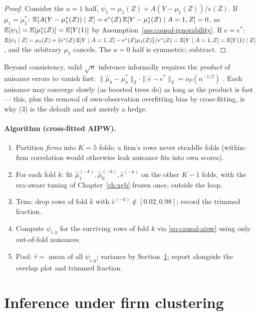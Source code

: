 \begin{proof}
Consider the $a=1$ half, $\psi_1 = \mu_1(Z) + A(Y - \mu_1(Z))/e(Z)$. If
$\mu_1 = \mu_1^*$: $\mathbb{E}[A(Y - \mu_1^*(Z)) \mid Z] = e^*(Z)\,\mathbb{E}[Y - \mu_1^*(Z) \mid A=1,
Z] = 0$, so $\mathbb{E}[\psi_1] = \mathbb{E}[\mu_1^*(Z)] = \mathbb{E}[Y(1)]$ by
Assumption~\ref{ass:causal-ignorability}. If $e = e^*$:
$\mathbb{E}[\psi_1 \mid Z] = \mu_1(Z) + \{e^*(Z)\,\mathbb{E}[Y \mid A=1,Z] - e^*(Z)\mu_1(Z)\}/e^*(Z)
= \mathbb{E}[Y \mid A=1, Z] = \mathbb{E}[Y(1) \mid Z]$, and the arbitrary $\mu_1$ cancels. The $a=0$
half is symmetric; subtract.
\end{proof}

\begin{remark}
\label{rem:causal-rates}
Beyond consistency, valid $\sqrt{n}$ inference informally requires the \emph{product}
of nuisance errors to vanish fast:
$\|\hat\mu_a - \mu_a^*\|_{2} \cdot \|\hat e - e^*\|_{2} = o_P(n^{-1/2})$
\cite{chernozhukov2018}. Each nuisance may converge slowly (as boosted trees do) as
long as the product is fast --- this, plus the removal of own-observation overfitting
bias by cross-fitting, is why (3) is the default and not merely a hedge.
\end{remark}

\paragraph{Algorithm (cross-fitted AIPW).}
\begin{enumerate}
\item Partition \emph{firms} into $K = 5$ folds; a firm's rows never straddle folds
(within-firm correlation would otherwise leak nuisance fits into own scores).
\item For each fold $k$: fit $\hat\mu_1^{(-k)}, \hat\mu_0^{(-k)}, \hat e^{(-k)}$ on the
other $K-1$ folds, with the era-aware tuning of Chapter~\ref{ch:xgb} frozen once,
outside the loop.
\item Trim: drop rows of fold $k$ with $\hat e^{(-k)} \notin [0.02, 0.98]$; record the
trimmed fraction.
\item Compute $\psi_{i,y}$ for the surviving rows of fold $k$ via
\eqref{eq:causal-aipw} using only out-of-fold nuisances.
\item Pool: $\hat\tau = $ mean of all $\psi_{i,y}$; variance by
Section~\ref{sec:causal-inference}; report alongside the overlap plot and trimmed
fraction.
\end{enumerate}

\section{Inference under firm clustering}
\label{sec:causal-inference}

